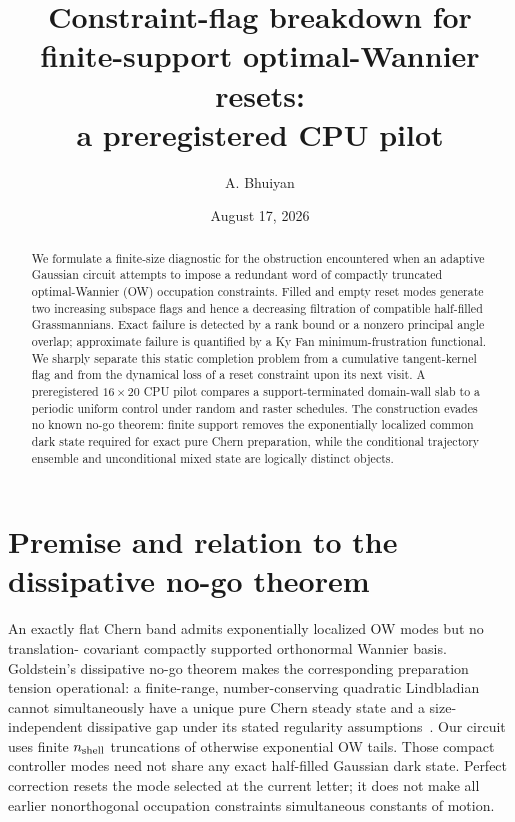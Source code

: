 \documentclass[aps,prb,onecolumn,nofootinbib,superscriptaddress]{revtex4-2}
\begin{document}
\title{Constraint-flag breakdown for finite-support optimal-Wannier resets:\\a preregistered CPU pilot}
\author{A. Bhuiyan}
\date{August 17, 2026}

\begin{abstract}
We formulate a finite-size diagnostic for the obstruction encountered when an adaptive
Gaussian circuit attempts to impose a redundant word of compactly truncated
optimal-Wannier (OW) occupation constraints.  Filled and empty reset modes generate two
increasing subspace flags and hence a decreasing filtration of compatible half-filled
Grassmannians.  Exact failure is detected by a rank bound or a nonzero principal angle
overlap; approximate failure is quantified by a Ky Fan minimum-frustration functional.
We sharply separate this static completion problem from a cumulative tangent-kernel flag
and from the dynamical loss of a reset constraint upon its next visit.  A preregistered
$16\times20$ CPU pilot compares a support-terminated domain-wall slab to a periodic
uniform control under random and raster schedules.  The construction evades no known
no-go theorem: finite support removes the exponentially localized common dark state
required for exact pure Chern preparation, while the conditional trajectory ensemble
and unconditional mixed state are logically distinct objects.
\end{abstract}

\maketitle
\setcounter{tocdepth}{2}
\tableofcontents

\section{Premise and relation to the dissipative no-go theorem}

An exactly flat Chern band admits exponentially localized OW modes but no translation-
covariant compactly supported orthonormal Wannier basis.  Goldstein's dissipative no-go
theorem makes the corresponding preparation tension operational: a finite-range,
number-conserving quadratic Lindbladian cannot simultaneously have a unique pure Chern
steady state and a size-independent dissipative gap under its stated regularity
assumptions~\cite{Goldstein2019}.  Our circuit uses finite $n_{\rm shell}$ truncations of
otherwise exponential OW tails.  Those compact controller modes need not share any
exact half-filled Gaussian dark state.  Perfect correction resets the mode selected at
the current letter; it does not make all earlier nonorthogonal occupation constraints
simultaneous constants of motion.
\end{document}

